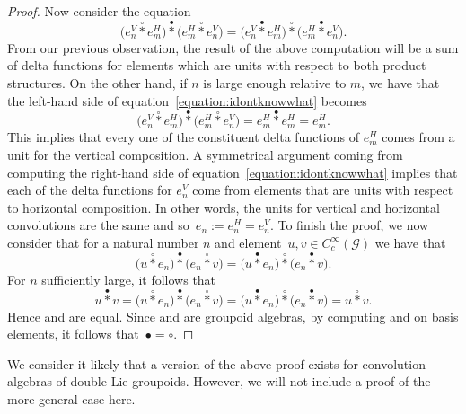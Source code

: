 \documentclass[pdftex]{sigma}
\numberwithin{equation}{section}
\theoremstyle{definition}
\newcommand{\CG}{\mathcal{G}}
\newcommand{\stardot}{\overset{{\bullet}}{*}}
\newcommand{\starcirc}{\overset{\circ}{*}}
\begin{document}
\begin{proof}
Now consider the equation
\begin{equation}\label{equation:idontknowwhat}
\big(e_n^V \starcirc e_m^H\big) \stardot \big( e_m^H \starcirc e^V_n\big)  = \big(e_n^V \stardot e_m^H\big) \starcirc \big( e_m^H \stardot e^V_n\big).
\end{equation}
From our previous observation, the result of the above computation will be a sum of delta functions for elements which are units with respect to both product structures. On the other hand, if $ n $ is large enough relative to $m$, we have that the left-hand side of equation~\eqref{equation:idontknowwhat} becomes
\[
\big(e_n^V \starcirc e_m^H\big) \stardot \big( e_m^H \starcirc e^V_n\big) = e_m^H \stardot e^H_m = e^H_m.
\]
This implies that every one of the constituent delta functions of $ e^H_m $ comes from a unit for the vertical composition. A symmetrical argument coming from computing the right-hand side of equation~\eqref{equation:idontknowwhat} implies that each of the delta functions for $ e^V_n $ come from elements that are units with respect to horizontal composition. In other words, the units for vertical and horizontal convolutions are the same and so~${e_n := e^H_n = e^V_n}$.
To finish the proof, we now consider that for a natural number $ n $ and element~${u,v \in C_c^\infty(\CG)}$ we have that
\[
\big(u \starcirc e_n\big) \stardot \big(e_n \starcirc v\big)  = \big(u \stardot e_n \big) \starcirc \big( e_n \stardot v\big).
\]
For $ n $ sufficiently large, it follows that
\[ u \stardot v = \big(u \starcirc e_n\big) \stardot \big(e_n \starcirc v\big)  = \big(u \stardot e_n \big) \starcirc \big( e_n \stardot v\big) = u \starcirc v.
\]
Hence \smash{$ \stardot$} and \smash{$ \starcirc$} are equal. Since \smash{$ \starcirc $} and \smash{$ \stardot $} are groupoid algebras, by computing \smash{$ \starcirc $} and \smash{$ \stardot $} on basis elements, it follows that~${\bullet = \circ}$.
\end{proof}

We consider it likely that a version of the above proof exists for convolution algebras of double Lie groupoids. However, we will not include a proof of the more general case here.
\end{document}
